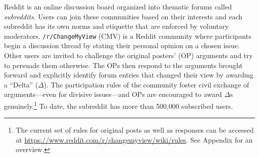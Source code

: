 Reddit is an online discussion board organized into thematic forums called \textit{subreddits}. Users can join these communities based on their interests and each subreddit has its own norms and etiquette that are enforced by voluntary moderators. \texttt{/r/ChangeMyView} (CMV) is a Reddit community where participants begin a discussion thread by stating their personal opinion on a chosen issue. Other users are invited to challenge the original posters' (OP) arguments and try to persuade them otherwise. The OPs then respond to the arguments brought forward and explicitly identify forum entries that changed their view by awarding a ``Delta'' ($\Delta$). The participation rules of the community foster civil exchange of arguments---even for divisive issues---and OPs are encouraged to award \(\Delta\)s genuinely.\footnote{The current set of rules for original posts as well as responses can be accessed at \url{https://www.reddit.com/r/changemyview/wiki/rules}. See Appendix for an overview.} To date, the subreddit has more than 500,000 subscribed users.



